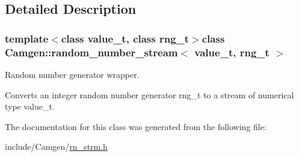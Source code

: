 \subsection{Detailed Description}
\subsubsection*{template$<$class value\-\_\-t, class rng\-\_\-t$>$class Camgen\-::random\-\_\-number\-\_\-stream$<$ value\-\_\-t, rng\-\_\-t $>$}

Random number generator wrapper. 

Converts an integer random number generator rng\-\_\-t to a stream of numerical type value\-\_\-t. 

The documentation for this class was generated from the following file\-:\begin{DoxyCompactItemize}
\item 
include/\-Camgen/\hyperlink{a00731}{rn\-\_\-strm.\-h}\end{DoxyCompactItemize}
